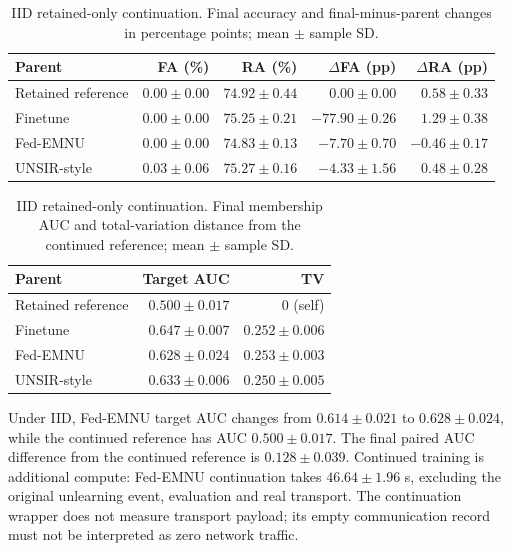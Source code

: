 \documentclass[software,article,submit,moreauthors]{Definitions/mdpi}
\begin{document}
\begin{table}[H]\centering\footnotesize\setlength{\tabcolsep}{4pt}
\caption{IID retained-only continuation. Final accuracy and final-minus-parent changes in percentage points; mean $\pm$ sample SD.}
\label{tab:continuation-iid}
\begin{tabular}{lrrrr}\toprule Parent & FA (\%) & RA (\%) & $\Delta$FA (pp) & $\Delta$RA (pp)\\\midrule
Retained reference & $0.00 \pm 0.00$ & $74.92 \pm 0.44$ & $0.00 \pm 0.00$ & $0.58 \pm 0.33$\\
Finetune & $0.00 \pm 0.00$ & $75.25 \pm 0.21$ & $-77.90 \pm 0.26$ & $1.29 \pm 0.38$\\
Fed-EMNU & $0.00 \pm 0.00$ & $74.83 \pm 0.13$ & $-7.70 \pm 0.70$ & $-0.46 \pm 0.17$\\
UNSIR-style & $0.03 \pm 0.06$ & $75.27 \pm 0.16$ & $-4.33 \pm 1.56$ & $0.48 \pm 0.28$\\
\bottomrule\end{tabular}\end{table}
\begin{table}[H]\centering\footnotesize\setlength{\tabcolsep}{4pt}
\caption{IID retained-only continuation. Final membership AUC and total-variation distance from the continued reference; mean $\pm$ sample SD.}
\label{tab:continuation-iid-compute}
\begin{tabular}{lrr}\toprule Parent & Target AUC & TV\\\midrule
Retained reference & $0.500 \pm 0.017$ & 0 (self)\\
Finetune & $0.647 \pm 0.007$ & $0.252 \pm 0.006$\\
Fed-EMNU & $0.628 \pm 0.024$ & $0.253 \pm 0.003$\\
UNSIR-style & $0.633 \pm 0.006$ & $0.250 \pm 0.005$\\
\bottomrule\end{tabular}\end{table}

Under IID, Fed-EMNU target AUC changes from $0.614 \pm 0.021$ to $0.628 \pm 0.024$, while the continued reference has AUC $0.500 \pm 0.017$. The final paired AUC difference from the continued reference is $0.128 \pm 0.039$. Continued training is additional compute: Fed-EMNU continuation takes $46.64 \pm 1.96$ s, excluding the original unlearning event, evaluation and real transport. The continuation wrapper does not measure transport payload; its empty communication record must not be interpreted as zero network traffic.
\end{document}
